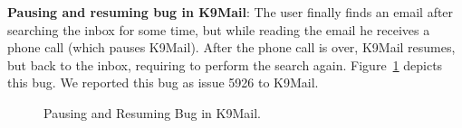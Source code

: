 {\bf Pausing and resuming bug in K9Mail}: The user finally finds an
email after searching the inbox for some time, but while reading the
email he receives a phone call (which pauses K9Mail). After the phone
call is over, K9Mail resumes, but back to the inbox, requiring to perform the
search again. Figure~\ref{fig:bug19} depicts this bug. We reported this bug as issue 5926 to K9Mail.
\begin{figure}[!t]
\centering
\begin{minipage}{.8\columnwidth}
\hfill
{}
\hfill
{}
\caption{Pausing and Resuming Bug in K9Mail.}
\label{fig:bug19}
\end{minipage}
\end{figure}

